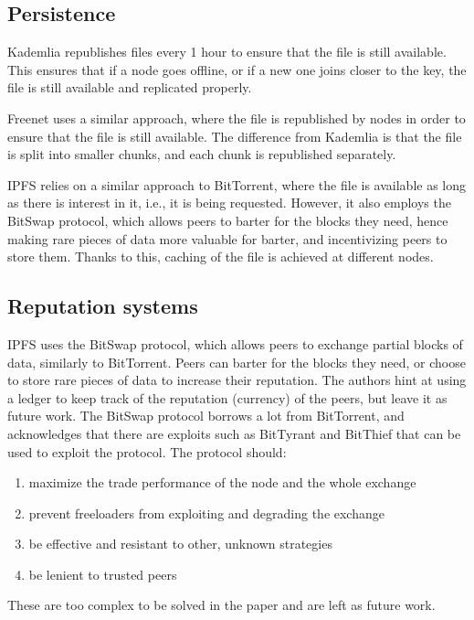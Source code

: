 \subsection{Persistence}

Kademlia \cite{kademlia} republishes files every 1 hour to ensure that the file is still available.
This ensures that if a node goes offline, or if a new one joins closer to the key, the file is still available
and replicated properly.

Freenet \cite{freenet} uses a similar approach, where the file is republished by nodes in order to 
ensure that the file is still available.
The difference from Kademlia is that the file is split into smaller chunks, and each chunk is
republished separately.

IPFS \cite{ipfs} relies on a similar approach to BitTorrent, where the file is available as long as there is 
interest in it, i.e., it is being requested.
However, it also employs the BitSwap protocol, which allows peers to barter for the blocks they need,
hence making rare pieces of data more valuable for barter, and incentivizing peers to store them.
Thanks to this, caching of the file is achieved at different nodes.





\subsection{Reputation systems}

IPFS \cite{ipfs} uses the BitSwap protocol, which allows peers to exchange partial blocks of data,
similarly to BitTorrent.
Peers can barter for the blocks they need, or choose to store rare pieces of data to increase their reputation.
The authors hint at using a ledger to keep track of the reputation (currency) of the peers,
but leave it as future work.
The BitSwap protocol borrows a lot from BitTorrent, and acknowledges that there are exploits such as
BitTyrant \cite{bittorrentexploits} and BitThief \cite{bittorrentexploits}
that can be used to exploit the protocol.
The protocol should:
\begin{enumerate}
    \item maximize the trade performance of the node and the whole exchange
    \item prevent freeloaders from exploiting and degrading the exchange
    \item be effective and resistant to other, unknown strategies
    \item be lenient to trusted peers
\end{enumerate}
These are too complex to be solved in the paper and are left as future work.

